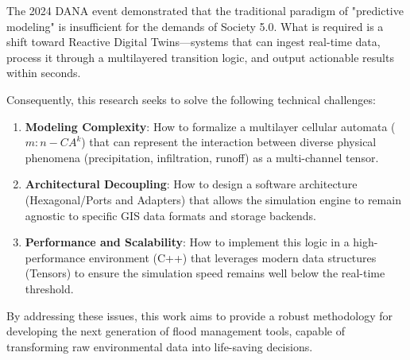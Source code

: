 The 2024 DANA event demonstrated that the traditional paradigm of "predictive modeling" is insufficient for the demands 
of Society 5.0. What is required is a shift toward Reactive Digital Twins—systems that can ingest real-time data, process 
it through a multilayered transition logic, and output actionable results within seconds.

Consequently, this research seeks to solve the following technical challenges:

\begin{enumerate}
    \item \textbf{Modeling Complexity}: How to formalize a multilayer cellular automata ($m:n-CA^k$) that can represent 
    the interaction between diverse physical phenomena (precipitation, infiltration, runoff) as a multi-channel tensor.
    \item \textbf{Architectural Decoupling}: How to design a software architecture (Hexagonal/Ports and Adapters) that 
    allows the simulation engine to remain agnostic to specific GIS data formats and storage backends.
    \item \textbf{Performance and Scalability}: How to implement this logic in a high-performance environment (C++) that 
    leverages modern data structures (Tensors) to ensure the simulation speed remains well below the real-time threshold.
\end{enumerate}

By addressing these issues, this work aims to provide a robust methodology for developing the next generation of flood 
management tools, capable of transforming raw environmental data into life-saving decisions.
